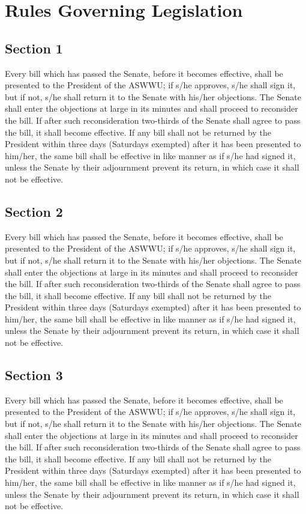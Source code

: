 \documentclass[11pt, letterpaper]{article}
\begin{document}
 
\section{Rules Governing Legislation}
\subsection{Section 1}
Every bill which has passed the Senate, before it becomes effective, shall be
presented to the President of the ASWWU; if s/he approves, s/he shall sign it,
but if not, s/he shall return it to the Senate with his/her objections. The Senate
shall enter the objections at large in its minutes and shall proceed to reconsider
the bill. If after such reconsideration two-thirds of the Senate shall agree to pass
the bill, it shall become effective. If any bill shall not be returned by the
President within three days (Saturdays exempted) after it has been presented to
him/her, the same bill shall be effective in like manner as if s/he had signed it,
unless the Senate by their adjournment prevent its return, in which case it shall
not be effective. 

\subsection{Section 2}
Every bill which has passed the Senate, before it becomes effective, shall be
presented to the President of the ASWWU; if s/he approves, s/he shall sign it,
but if not, s/he shall return it to the Senate with his/her objections. The Senate
shall enter the objections at large in its minutes and shall proceed to reconsider
the bill. If after such reconsideration two-thirds of the Senate shall agree to pass
the bill, it shall become effective. If any bill shall not be returned by the
President within three days (Saturdays exempted) after it has been presented to
him/her, the same bill shall be effective in like manner as if s/he had signed it,
unless the Senate by their adjournment prevent its return, in which case it shall
not be effective. 

\subsection{Section 3}
Every bill which has passed the Senate, before it becomes effective, shall be
presented to the President of the ASWWU; if s/he approves, s/he shall sign it,
but if not, s/he shall return it to the Senate with his/her objections. The Senate
shall enter the objections at large in its minutes and shall proceed to reconsider
the bill. If after such reconsideration two-thirds of the Senate shall agree to pass
the bill, it shall become effective. If any bill shall not be returned by the
President within three days (Saturdays exempted) after it has been presented to
him/her, the same bill shall be effective in like manner as if s/he had signed it,
unless the Senate by their adjournment prevent its return, in which case it shall
not be effective. 
\end{document}
